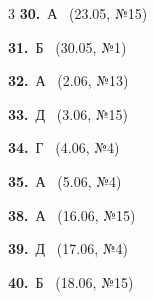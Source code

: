 \documentclass[12pt]{article}
\begin{document}
\ifshowsolutions
{}
\begin{multicols}{3}\noindent
\noindent\textbf{30.}~А \ {\scriptsize\color{gray}(23.05, №15)}\par
\noindent\textbf{31.}~Б \ {\scriptsize\color{gray}(30.05, №1)}\par
\noindent\textbf{32.}~А \ {\scriptsize\color{gray}(2.06, №13)}\par
\noindent\textbf{33.}~Д \ {\scriptsize\color{gray}(3.06, №15)}\par
\noindent\textbf{34.}~Г \ {\scriptsize\color{gray}(4.06, №4)}\par
\noindent\textbf{35.}~А \ {\scriptsize\color{gray}(5.06, №4)}\par
\noindent\textbf{38.}~А \ {\scriptsize\color{gray}(16.06, №15)}\par
\noindent\textbf{39.}~Д \ {\scriptsize\color{gray}(17.06, №4)}\par
\noindent\textbf{40.}~Б \ {\scriptsize\color{gray}(18.06, №15)}\par
\end{multicols}
\fi

\endgroup
\end{document}

